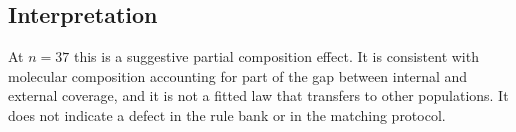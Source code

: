 \subsection{Interpretation}

At $n=37$ this is a suggestive partial composition effect. It is consistent with molecular
composition accounting for part of the gap between internal and external coverage, and it is not
a fitted law that transfers to other populations. It does not indicate a defect in the rule bank
or in the matching protocol.
